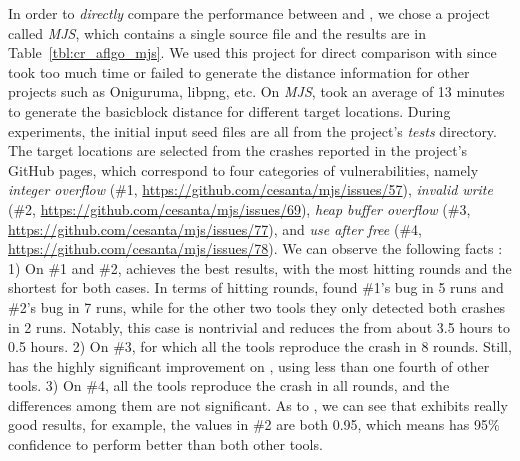 In order to \emph{directly} compare the performance between {\dFOT} and {\aflgo}, we chose a project called \emph{MJS}, which contains a single source file and the results are in Table~\ref{tbl:cr_aflgo_mjs}.
We used this project for direct comparison with \aflgo since \aflgo took too much time or failed to generate the distance information for other projects such as Oniguruma, libpng, etc. 
On \emph{MJS}, \aflgo took an average of 13 minutes to generate the basicblock distance for different target locations.
During experiments, the initial input seed files are all from the project's \emph{tests} directory. The target locations are selected from the crashes reported in the project's GitHub pages, which correspond to four categories of vulnerabilities, namely \emph{integer overflow} (\#1, \url{https://github.com/cesanta/mjs/issues/57}), \emph{invalid write} (\#2, \url{https://github.com/cesanta/mjs/issues/69}), \emph{heap buffer overflow} (\#3, \url{https://github.com/cesanta/mjs/issues/77}), and \emph{use after free} (\#4, \url{https://github.com/cesanta/mjs/issues/78}). We can observe the following facts : 
1) On \#1 and \#2,  \dFOT achieves the best results, with the most hitting rounds and the shortest {\utte} for both cases.  In terms of hitting rounds, {\dFOT} found \#1's bug in 5 runs and \#2's bug in 7 runs, while for the other two tools they only detected both crashes in 2 runs. Notably, this case is nontrivial and {\dFOT} reduces the {\utte} from about 3.5 hours to 0.5 hours.
2) On \#3, for which all the tools reproduce the crash in 8 rounds. Still, \dFOT has the highly significant improvement on {\utte}, using less than one fourth {\utte} of other tools.
3) On \#4, all the tools reproduce the crash in all rounds, and the {\utte} differences among them are not significant.
As to \alz, we can see that \dFOT exhibits really good results, for  example, the values in \#2 are both 0.95, which means \dFOT has 95\% confidence to perform better than both other tools.



